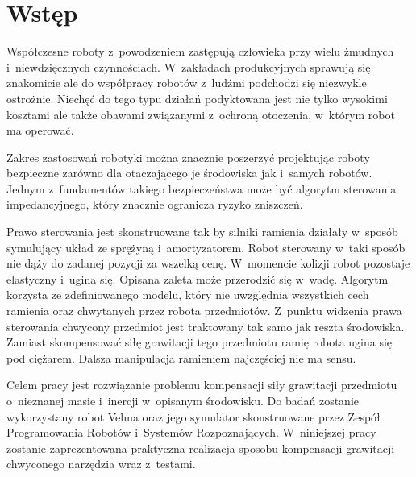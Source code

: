 
\chapter{Wstęp\label{chap:wstep}}

	Współczesne roboty z~powodzeniem zastępują człowieka przy wielu żmudnych i~niewdzięcznych czynnościach.  W~zakładach produkcyjnych sprawują się znakomicie ale do współpracy robotów z~ludźmi podchodzi się niezwykle ostrożnie. Niechęć do tego typu działań podyktowana jest nie tylko wysokimi kosztami ale także obawami związanymi z~ochroną otoczenia, w~którym robot ma operować.
	
	Zakres zastosowań robotyki można znacznie poszerzyć projektując roboty bezpieczne zarówno dla otaczającego je środowiska jak i~samych robotów. Jednym z~fundamentów takiego bezpieczeństwa może być algorytm sterowania impedancyjnego, który znacznie ogranicza ryzyko zniszczeń. 
	
	Prawo sterowania jest skonstruowane tak by silniki ramienia działały w~sposób symulujący układ ze sprężyną i~amortyzatorem. Robot sterowany w~taki sposób nie dąży do zadanej pozycji za wszelką cenę. W~momencie kolizji robot pozostaje elastyczny i~ugina się. Opisana zaleta może przerodzić się w~wadę. Algorytm korzysta ze zdefiniowanego modelu, który nie uwzględnia wszystkich cech ramienia oraz chwytanych przez robota przedmiotów. Z~punktu widzenia prawa sterowania chwycony przedmiot jest traktowany tak samo jak reszta środowiska. Zamiast skompensować siłę grawitacji tego przedmiotu ramię robota ugina się pod ciężarem. Dalsza manipulacja ramieniem najczęściej nie ma 
	sensu. 

	Celem pracy jest rozwiązanie problemu kompensacji siły grawitacji przedmiotu o~nieznanej masie i~inercji w~opisanym środowisku. 
	Do badań zostanie wykorzystany robot Velma oraz jego symulator skonstruowane przez Zespół Programowania Robotów i~Systemów Rozpoznających. W~niniejszej pracy zostanie zaprezentowana praktyczna realizacja sposobu kompensacji grawitacji chwyconego narzędzia wraz z~testami.
